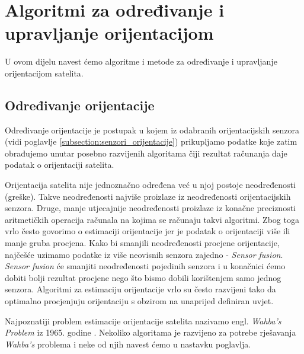 \documentclass[times, utf8, diplomski, numeric]{templates/template}
\begin{document}
{    \section{Algoritmi za određivanje i upravljanje orijentacijom}{
        U ovom dijelu navest ćemo algoritme i metode za određivanje i upravljanje orijentacijom satelita. 
 
        \subsection{Određivanje orijentacije}{
        \label{subsection:odredjivanje_orijentacije}
            Određivanje orijentacije je postupak u kojem iz odabranih orijentacijskih senzora (vidi poglavlje \ref{subsection:senzori_orijentacije}) prikupljamo podatke koje zatim obrađujemo unutar posebno razvijenih algoritama čiji rezultat računanja daje podatak o orijentaciji satelita. 

            Orijentacija satelita nije jednoznačno određena već u njoj postoje neodređenosti (greške). Takve neodređenosti najviše proizlaze iz neodređenosti orijentacijskih senzora. Druge, manje utjecajnije neodređenosti proizlaze iz konačne preciznosti aritmetičkih operacija računala na kojima se računaju takvi algoritmi. Zbog toga vrlo često govorimo o estimaciji orijentacije jer je podatak o orijentaciji više ili manje gruba procjena. Kako bi smanjili neodređenosti procjene orijentacije, najčešće uzimamo podatke iz više neovisnih senzora zajedno - \emph{Sensor fusion}. \emph{Sensor fusion} će smanjiti neodređenosti pojedinih senzora i u konačnici ćemo dobiti bolji rezultat procjene nego što bismo dobili korištenjem samo jednog senzora. Algoritmi za estimaciju orijentacije vrlo su često razvijeni tako da optimalno procjenjuju orijentaciju s obzirom na unaprijed definiran uvjet. 

            Najpoznatiji problem estimacije orijentacije satelita nazivamo engl. \emph{Wahba's Problem} iz 1965. godine \cite{wahbas_problem}. Nekoliko algoritama je razvijeno za potrebe rješavanja \emph{Wahba's} problema i neke od njih navest ćemo u nastavku poglavlja.

}}}
\end{document}
